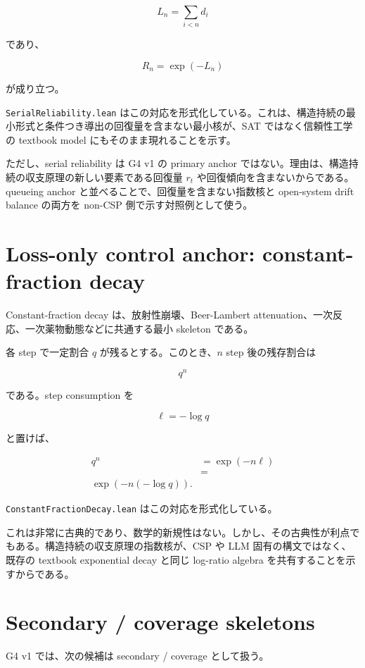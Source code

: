 \documentclass[12pt,a4paper]{article}
\begin{document}
\[
L_{n}=\sum_{i<n}d_{i}
\]

であり、

\[
R_{n}=\exp(-L_{n})
\]

が成り立つ。

\texttt{SerialReliability.lean} はこの対応を形式化している。これは、構造持続の最小形式と条件つき導出の回復量を含まない最小核が、SAT ではなく信頼性工学の textbook model にもそのまま現れることを示す。

ただし、serial reliability は G4 v1 の primary anchor ではない。理由は、構造持続の収支原理の新しい要素である回復量 \(r_{t}\) や回復傾向を含まないからである。queueing anchor と並べることで、回復量を含まない指数核と open-system drift balance の両方を non-CSP 側で示す対照例として使う。

\section{Loss-only control anchor: constant-fraction decay}\label{loss-only-control-anchor-constant-fraction-decay}

Constant-fraction decay は、放射性崩壊、Beer-Lambert attenuation、一次反応、一次薬物動態などに共通する最小 skeleton である。

各 step で一定割合 \(q\) が残るとする。このとき、\(n\) step 後の残存割合は

\[
q^n
\]

である。step consumption を

\[
\ell=-\log q
\]

と置けば、

\[
\begin{aligned}
q^n&=\exp(-n\ell) \\
&= \\
\exp(-n(-\log q)).
\end{aligned}
\]

\texttt{ConstantFractionDecay.lean} はこの対応を形式化している。

これは非常に古典的であり、数学的新規性はない。しかし、その古典性が利点でもある。構造持続の収支原理の指数核が、CSP や LLM 固有の構文ではなく、既存の textbook exponential decay と同じ log-ratio algebra を共有することを示すからである。

\section{Secondary / coverage skeletons}\label{secondary-coverage-skeletons}

G4 v1 では、次の候補は secondary / coverage として扱う。
\end{document}
